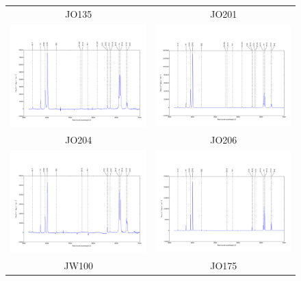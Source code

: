 \documentclass[fleqn,usenatbib]{mnras}
\begin{document}
\begin{figure}
	\begin{tabular}{cc}
		JO135 &  JO201\\
		\includegraphics[width=.5\linewidth]{Plots/JO135_nucleus}	& 		\includegraphics[width=.5\linewidth]{Plots/JO201_nucleus} \\
		JO204 &  JO206\\
		\includegraphics[width=.5\linewidth]{Plots/JO204_nucleus}&
		\includegraphics[width=.5\linewidth]{Plots/JO206_nucleus} \\
		JW100 &  JO175\\

\end{tabular}
\end{figure}
\end{document}
